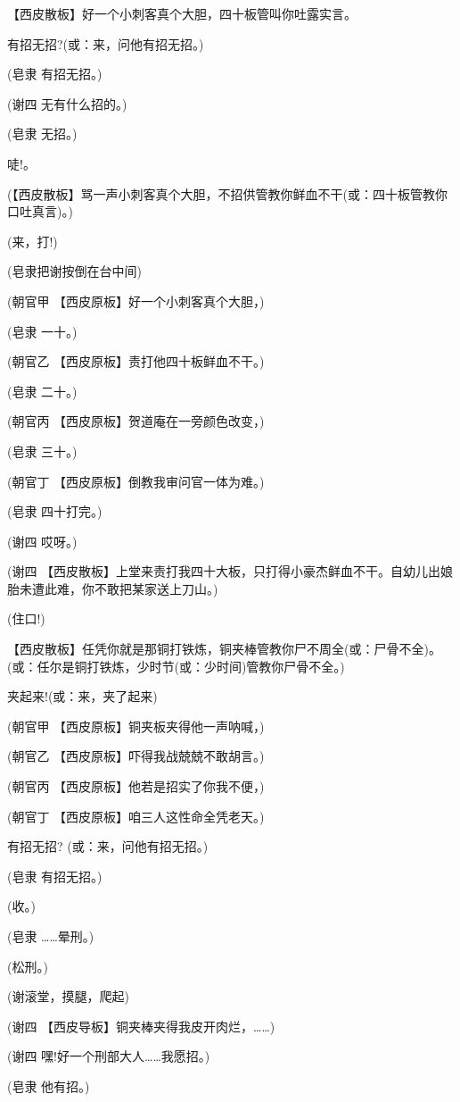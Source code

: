 【西皮散板】好一个小刺客真个大胆，四十板管叫你吐露实言。

有招无招?(或：来，问他有招无招。)

(皂隶 有招无招。)

(谢四 无有什么招的。)

(皂隶 无招。)

唗!。

(【西皮散板】骂一声小刺客真个大胆，不招供管教你鲜血不干(或：四十板管教你口吐真言)。)

(来，打!)

(皂隶把谢按倒在台中间)

(朝官甲 【西皮原板】好一个小刺客真个大胆，)

(皂隶 一十。)

(朝官乙 【西皮原板】责打他四十板鲜血不干。)

(皂隶 二十。)

(朝官丙 【西皮原板】贺道庵在一旁颜色改变，)

(皂隶 三十。)

(朝官丁 【西皮原板】倒教我审问官一体为难。)

(皂隶 四十打完。)

(谢四 哎呀。)

(谢四
【西皮散板】上堂来责打我四十大板，只打得小豪杰鲜血不干。自幼儿出娘胎未遭此难，你不敢把某家送上刀山。)

(住口!)

【西皮散板】任凭你就是那铜打铁炼，铜夹棒管教你尸不周全(或：尸骨不全)。(或：任尔是铜打铁炼，少时节(或：少时间)管教你尸骨不全。)

夹起来!(或：来，夹了起来)

(朝官甲 【西皮原板】铜夹板夹得他一声呐喊，)

(朝官乙 【西皮原板】吓得我战兢兢不敢胡言。)

(朝官丙 【西皮原板】他若是招实了你我不便，)

(朝官丁 【西皮原板】咱三人这性命全凭老天。)

有招无招? (或：来，问他有招无招。)

(皂隶 有招无招。)

(收。)

(皂隶 \ldots{}\ldots{}晕刑。)

(松刑。)

(谢滚堂，摸腿，爬起)

(谢四 【西皮导板】铜夹棒夹得我皮开肉烂，\ldots{}\ldots{})

(谢四 嘿!好一个刑部大人\ldots{}\ldots{}我愿招。)

(皂隶 他有招。)

